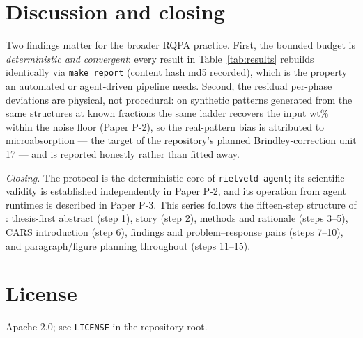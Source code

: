 \documentclass[11pt,a4paper]{article}
\begin{document}
\section{Discussion and closing}\label{sec:disc}
Two findings matter for the broader RQPA practice. First, the bounded
budget is \emph{deterministic and convergent}: every result in
Table~\ref{tab:results} rebuilds identically via \texttt{make report}
(content hash md5 recorded), which is the property an automated or
agent-driven pipeline needs. Second, the residual per-phase deviations
are physical, not procedural: on synthetic patterns generated from the
same structures at known fractions the same ladder recovers the input
wt\% within the noise floor (Paper P-2), so the real-pattern bias is
attributed to microabsorption --- the target of the repository's planned
Brindley-correction unit 17 --- and is reported honestly rather than
fitted away.

\emph{Closing.} The protocol is the deterministic core of
\texttt{rietveld-agent}; its scientific validity is established
independently in Paper P-2, and its operation from agent runtimes is
described in Paper P-3. This series follows the fifteen-step structure of
\cite{drake2025fifteen}: thesis-first abstract (step 1), story
(step 2), methods and rationale (steps 3--5), CARS introduction
(step 6), findings and problem--response pairs (steps 7--10), and
paragraph/figure planning throughout (steps 11--15).

\section*{License}
Apache-2.0; see \texttt{LICENSE} in the repository root.



\end{document}
